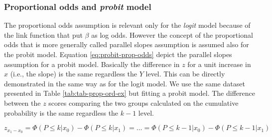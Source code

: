 \documentclass[
  man,floatsintext]{apa6}
\begin{document}
\subsubsection{\texorpdfstring{Proportional odds and \emph{probit} model}{Proportional odds and probit model}}\label{proportional-odds-and-probit-model}

The proportional odds assumption is relevant only for the \emph{logit} model because of the link function that put \(\beta\) as log odds. However the concept of the proportional odds that is more generally called parallel slopes assumption is assumed also for the probit model. Equation \eqref{eq:probit-prop-odds} depict the parallel slopes assumption for a probit model. Basically the difference in \(z\) for a unit increase in \(x\) (i.e., the slope) is the same regardless the \(Y\) level. This can be directly demonstrated in the same way as for the logit model. We use the same dataset presented in Table \ref{tab:tab-prop-ord-ex} but fitting a probit model. The difference between the \(z\) scores comparing the two groups calculated on the cumulative probability is the same regardless the \(k - 1\) level.

\[
z_{x_1 - x_0} = \Phi(P \leq k|x_0) - \Phi(P \leq k|x_1) = \dots = \Phi(P \leq k - 1|x_0) - \Phi(P \leq k - 1|x_1)
\]

\scriptsize
\end{document}
